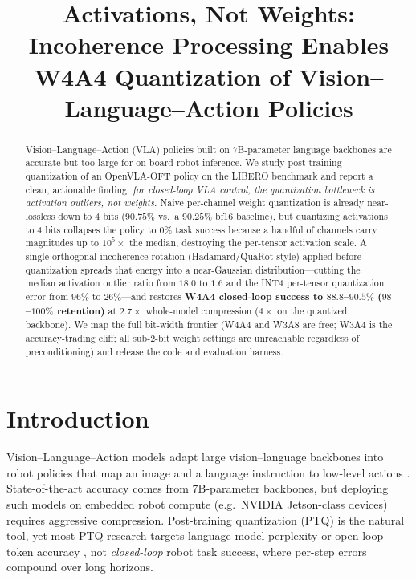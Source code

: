 \documentclass[conference]{IEEEtran}
\title{Activations, Not Weights: Incoherence Processing Enables\\
W4A4 Quantization of Vision--Language--Action Policies}
\author{
\IEEEauthorblockN{Justin Williams, Kishor Datta Gupta, Roy George, Mrinmoy Sarkar}
\IEEEauthorblockA{Clark Atlanta University \quad \texttt{justinwilliamstech693@gmail.com}}
}
\begin{document}
\maketitle

\begin{abstract}
Vision--Language--Action (VLA) policies built on 7B-parameter language backbones are
accurate but too large for on-board robot inference. We study post-training quantization
of an OpenVLA-OFT policy on the LIBERO benchmark and report a clean, actionable finding:
\emph{for closed-loop VLA control, the quantization bottleneck is activation outliers, not
weights.} Naive per-channel weight quantization is already near-lossless down to 4 bits
($90.75\%$ vs.\ a $90.25\%$ bf16 baseline), but quantizing activations to 4 bits collapses
the policy to $0\%$ task success because a handful of channels carry magnitudes up to
$10^5\times$ the median, destroying the per-tensor activation scale. A single orthogonal
incoherence rotation (Hadamard/QuaRot-style) applied before quantization spreads that energy
into a near-Gaussian distribution---cutting the median activation outlier ratio from $18.0$
to $1.6$ and the INT4 per-tensor quantization error from $96\%$ to $26\%$---and restores
\textbf{W4A4 closed-loop success to $88.8$--$90.5\%$ ($98$--$100\%$ retention)} at $2.7\times$
whole-model compression ($4\times$ on the quantized backbone). We map the full bit-width
frontier (W4A4 and W3A8 are free; W3A4 is the accuracy-trading cliff; all sub-2-bit weight
settings are unreachable regardless of preconditioning) and release the code and evaluation
harness.
\end{abstract}

\section{Introduction}
Vision--Language--Action models adapt large vision--language backbones into robot policies
that map an image and a language instruction to low-level actions
\cite{openvla,openvlaoft}. State-of-the-art accuracy comes from 7B-parameter backbones, but
deploying such models on embedded robot compute (e.g.\ NVIDIA Jetson-class devices) requires
aggressive compression. Post-training quantization (PTQ) is the natural tool, yet most PTQ
research targets language-model perplexity or open-loop token accuracy
\cite{gptq,awq,smoothquant,quarot,spinquant}, not \emph{closed-loop} robot task success,
where per-step errors compound over long horizons.
\end{document}
